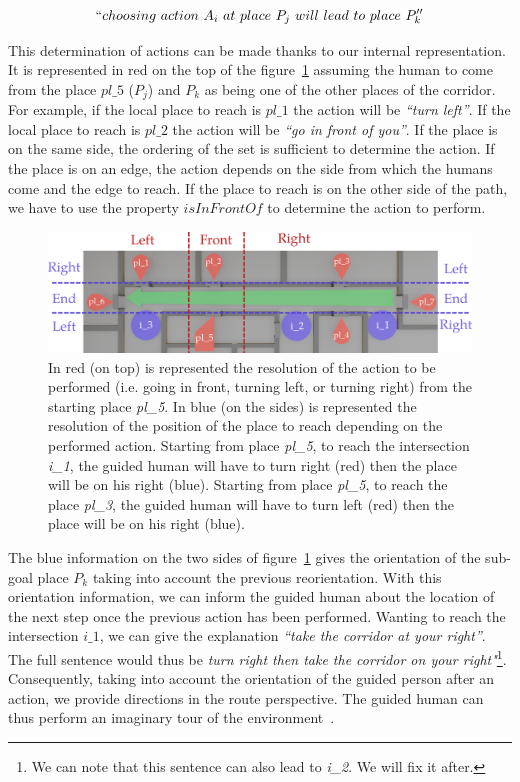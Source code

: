 \begin{gather*}
``choosing\ action\ A_i\ at\ place\ P_j\ will\ lead\ to\ place\ P_k''
\end{gather*}

This determination of actions can be made thanks to our internal representation. It is represented in red on the top of the figure~\ref{fig:chap3_directions} assuming the human to come from the place $pl\_5$ ($P_j$) and $P_k$ as being one of the other places of the corridor. For example, if the local place to reach is $pl\_1$ the action will be \textit{``turn left''}. If the local place to reach is $pl\_2$ the action will be \textit{``go in front of you''}. If the place is on the same side, the ordering of the set is sufficient to determine the action. If the place is on an edge, the action depends on the side from which the humans come and the edge to reach. If the place to reach is on the other side of the path, we have to use the property $isInFrontOf$ to determine the action to perform.

\begin{figure}[ht!]
\centering
\includegraphics[width=\textwidth]{figures/chapter3/directions.png}
\caption{\label{fig:chap3_directions} In red (on top) is represented the resolution of the action to be performed (i.e. going in front, turning left, or turning right) from the starting place \textit{pl\_5}. In blue (on the sides) is represented the resolution of the position of the place to reach depending on the performed action. Starting from place \textit{pl\_5}, to reach the intersection \textit{i\_1}, the guided human will have to turn right (red) then the place will be on his right (blue). Starting from place \textit{pl\_5}, to reach the place \textit{pl\_3}, the guided human will have to turn left (red) then the place will be on his right (blue). }
\end{figure}

The blue information on the two sides of figure~\ref{fig:chap3_directions} gives the orientation of the sub-goal place $P_{k}$ taking into account the previous reorientation. With this orientation information, we can inform the guided human about the location of the next step once the previous action has been performed. Wanting to reach the intersection $i\_1$, we can give the explanation \textit{``take the corridor at your right''}. The full sentence would thus be \textit{turn right then take the corridor on your right"}\footnote{We can note that this sentence can also lead to \textit{i\_2}. We will fix it after.}. Consequently, taking into account the orientation of the guided person after an action, we provide directions in the route perspective. The guided human can thus perform an imaginary tour of the environment~\cite{cassell_2007_trading}.

